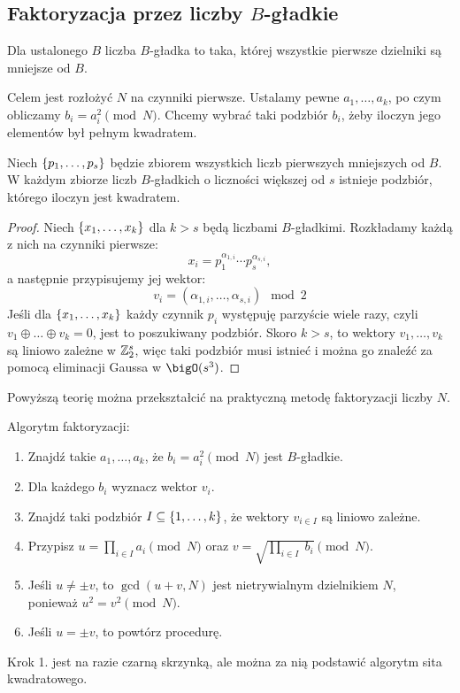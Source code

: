 \subsection{Faktoryzacja przez liczby \( B \)-gładkie}
\begin{definition}
    Dla ustalonego \( B \) liczba \( B \)-gładka to taka, której wszystkie pierwsze dzielniki są mniejsze od \( B \).
\end{definition}
    
Celem jest rozłożyć \( N \) na czynniki pierwsze. Ustalamy pewne \( a_1, \dots, a_k \), po czym obliczamy \( b_i = a_i^2 \pmod{N} \). Chcemy wybrać taki podzbiór \(b_i \), żeby iloczyn jego elementów był pełnym kwadratem.

\begin{lemma}
    Niech \( \set{p_1, \dots, p_{s}} \) będzie zbiorem wszystkich liczb pierwszych mniejszych od \( B \). W każdym zbiorze liczb \( B \)-gładkich o liczności większej od \( s \) istnieje podzbiór, którego iloczyn jest kwadratem.
\end{lemma}
\begin{proof}
    Niech \( \set{x_1, \dots, x_k} \) dla \( k > s \) będą liczbami \( B \)-gładkimi. Rozkładamy każdą z nich na czynniki pierwsze:
    \[
        x_i = p_1^{\alpha_{1, i}} \cdots p_s^{\alpha_{s, i}},
    \]
    a następnie przypisujemy jej wektor:
    \[
        v_i = (\alpha_{1, i}, \dots, \alpha_{s, i}) \mod 2
    \]
    Jeśli dla \( \set{x_1, \dots, x_k} \) każdy czynnik \( p_i \) występuję parzyście wiele razy, czyli \( v_1 \oplus \ldots \oplus v_k = 0 \), jest to poszukiwany podzbiór.
    Skoro \( k > s \), to wektory \( v_1, \dots, v_k \) są liniowo zależne w \( \mathbb{Z}_2^{s} \), więc taki podzbiór musi istnieć i można go znaleźć za pomocą eliminacji Gaussa w \( \bigO(s^3) \).
\end{proof}
Powyższą teorię można przekształcić na praktyczną metodę faktoryzacji liczby \( N \).
\begin{greyframe}
    Algorytm faktoryzacji:
    \begin{enumerate}
        \item Znajdź takie \( a_1, \dots, a_k \), że \( b_i = a_i^2 \pmod{N} \) jest \( B \)-gładkie.
        \item Dla każdego \( b_i \) wyznacz wektor \( v_i \).
        \item Znajdź taki podzbiór \( I \subseteq \set{1, \dots, k} \), że wektory \( v_{i \in I} \) są liniowo zależne.
        \item Przypisz \( u = \prod_{i \in I} a_i \pmod{N} \) oraz \( v = \sqrt{\prod_{i \in I}\; b_i} \pmod{N} \).
        \item Jeśli \( u \neq \pm v \), to \( \gcd(u + v, N) \) jest nietrywialnym dzielnikiem \( N \), \\ ponieważ \( u^2 = v^2 \pmod{N} \).
        \item Jeśli \( u = \pm v \), to powtórz procedurę.
    \end{enumerate}
\end{greyframe}
Krok 1. jest na razie czarną skrzynką, ale można za nią podstawić algorytm sita kwadratowego.

